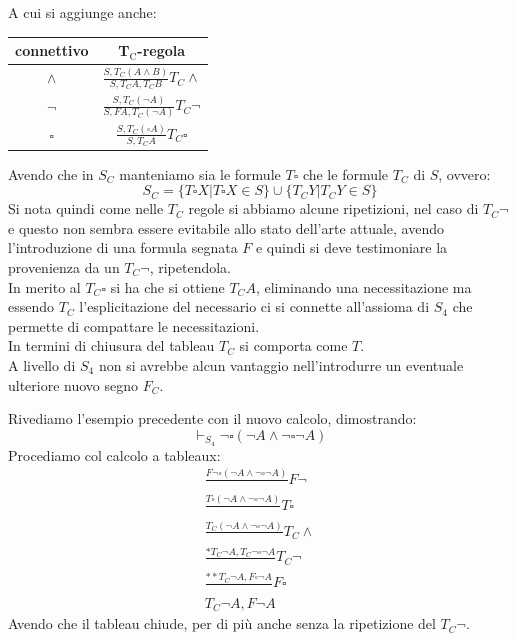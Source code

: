 \documentclass[a4paper,12pt, oneside]{book}
\begin{document}
A cui si aggiunge anche:
\begin{table}[H]
  \Large
  \centering
  \begin{tabular}{c||c}
    connettivo& T$_{\mbox{C}}$-regola\\
    \hline
    \hline
    $\land$ & $\frac{S,T_C(A\land B)}{S,T_CA,T_CB}T_C\land$\\
    \hline
    $\neg$ & $\frac{S,T_C(\neg A)}{S,FA,T_C(\neg A)}T_C\neg$\\
    \hline
    $\square$ & $\frac{S,T_C(\square A)}{S,T_CA}T_C\square$
  \end{tabular}
\end{table}
Avendo che in $S_C$ manteniamo sia le formule $T\square$ che le formule $T_C$ di
$S$, ovvero:
\[S_C=\{T\square X|T\square X\in S\}\cup\{T_CY|T_CY\in S\}\]
Si nota quindi come nelle $T_C$ regole si abbiamo alcune ripetizioni, nel caso
di $T_C\neg$ e questo non sembra essere evitabile allo stato dell'arte
attuale, avendo l'introduzione di una formula segnata $F$ e quindi si deve
testimoniare la provenienza da un $T_C\neg$, ripetendola.\\
In merito al $T_C\square$ si ha che si ottiene $T_CA$, eliminando una
necessitazione ma essendo $T_C$ l'esplicitazione del necessario ci si connette
all'assioma di $S_4$ che permette di compattare le necessitazioni.\\
In termini di chiusura del tableau $T_C$ si comporta come $T$.\\
A livello di $S_4$ non si avrebbe alcun vantaggio nell'introdurre un eventuale
ulteriore nuovo segno $F_C$.
\begin{esempio}
  Rivediamo l'esempio precedente con il nuovo calcolo, dimostrando:
  \[\vdash_{S_4}\neg\square(\neg A\land \neg \square\neg A)\]
  Procediamo col calcolo a tableaux:
  \begin{gather*}
    \frac{F\neg\square(\neg A\land \neg \square\neg A)}{}F\neg\\
    \frac{T\square(\neg A\land \neg \square\neg A)}{}T\square\\
    \frac{T_C(\neg A\land \neg \square\neg A)}{}T_C\land\\
    \frac{*T_C\neg A, T_C\neg\square\neg A}{}T_C\neg\\
    \frac{**T_C\neg A, F\square\neg A}{}F\square\\
    T_C\neg A,F\neg A
  \end{gather*}
  Avendo che il tableau chiude, per di più anche senza la ripetizione del
  $T_C\neg$. 
\end{esempio}
\end{document}
